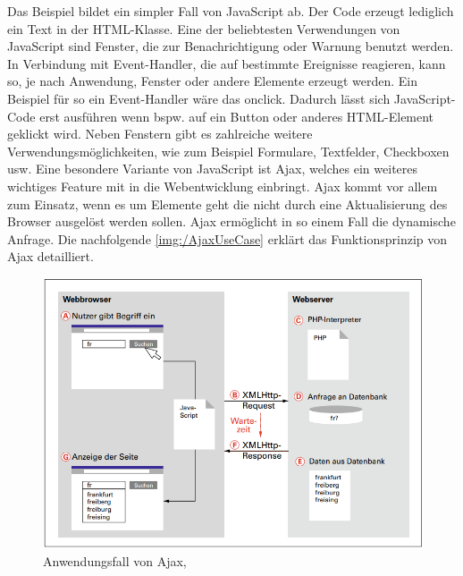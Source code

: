\documentclass[a4paper,titlepage,halfparskip,12pt]{scrreprt}
\begin{document}
\begin{onehalfspacing}
Das Beispiel bildet ein simpler Fall von JavaScript ab. Der Code erzeugt lediglich ein Text in der HTML-Klasse. Eine der beliebtesten Verwendungen von JavaScript sind Fenster, die zur Benachrichtigung oder Warnung benutzt werden. In Verbindung mit Event-Handler, die auf bestimmte Ereignisse reagieren, kann so, je nach Anwendung, Fenster oder andere Elemente erzeugt werden. Ein Beispiel für so ein Event-Handler wäre das \glqq onclick\grqq. Dadurch lässt sich JavaScript-Code erst ausführen wenn bspw. auf ein Button oder anderes \ac{HTML}-Element geklickt wird. Neben Fenstern gibt es zahlreiche weitere Verwendungsmöglichkeiten, wie zum Beispiel Formulare, Textfelder, Checkboxen usw. Eine besondere Variante von JavaScript ist \ac{Ajax}, welches ein weiteres wichtiges Feature mit in die Webentwicklung einbringt. \ac{Ajax} kommt vor allem zum Einsatz, wenn es um Elemente geht die nicht durch eine Aktualisierung des Browser ausgelöst werden sollen. \ac{Ajax} ermöglicht in so einem Fall die dynamische Anfrage. Die nachfolgende \autoref{img:/AjaxUseCase} erklärt das Funktionsprinzip von \ac{Ajax} detailliert.
\begin{figure}[h]
	\centering
	\includegraphics[scale=1.0]{images/AjaxUseCase}
	\caption{Anwendungsfall von Ajax, \cite{buhler2018webtechnologien}} 
	\label{img:/AjaxUseCase}
\end{figure}

\end{onehalfspacing}
\end{document}
